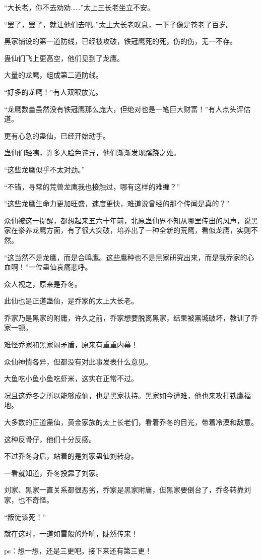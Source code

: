 \begin{this_body}
“大长老，你不去劝劝……”太上三长老坐立不安。

“罢了，罢了，就让他们去吧。”太上大长老叹息，一下子像是苍老了百岁。

黑家铺设的第一道防线，已经被攻破，铁冠鹰死的死，伤的伤，无一不存。

蛊仙们飞上更高空，他们见到了龙鹰。

大量的龙鹰，组成第二道防线。

“好多的龙鹰！”有人双眼放光。

“龙鹰数量虽然没有铁冠鹰那么庞大，但绝对也是一笔巨大财富！”有人点头评估道。

更有心急的蛊仙，已经开始动手。

蛊仙们轻咦，许多人脸色诧异，他们渐渐发现蹊跷之处。

“这些龙鹰似乎不太对劲。”

“不错，寻常的荒兽龙鹰我也接触过，哪有这样的难缠？”

“这些龙鹰生命力更加旺盛，速度更快，难道说曾经的那个传闻是真的？”

众仙被这一提醒，都想起来五六十年前，北原蛊仙界不知从哪里传出的风声，说黑家在豢养龙鹰方面，有了很大突破，培养出了一种全新的荒鹰，看似龙鹰，实则不然。

“这当然不是龙鹰，而是合鸣鹰。这些鹰种也不是黑家研究出来，而是我乔家的心血啊！”一位蛊仙哀痛悲呼。

众人视之，原来是乔冬。

此仙也是正道蛊仙，是乔家的太上大长老。

乔家乃是黑家的附庸，许久之前，乔家想要脱离黑家，结果被黑城破坏，教训了乔家一顿。

难怪乔家和黑家闹矛盾，原来有重重内幕！

众仙神情各异，但都没有对此事发表什么意见。

大鱼吃小鱼小鱼吃虾米，这实在正常不过。

况且这乔冬之所以能够成仙，也是黑家扶持。黑家如今遭难，他也来攻打铁鹰福地。

大多数的正道蛊仙，黄金家族的太上长老们，看着乔冬的目光，带着冷漠和敌意。

这种反骨仔，他们十分反感。

不过乔冬身后，站着的是刘家蛊仙刘转身。

一看就知道，乔冬投靠了刘家。

刘家、黑家一直关系都很恶劣，乔家是黑家附庸，但黑家要倒台了，乔冬转靠刘家，也不奇怪。

“叛徒该死！”

就在这时，一道如雷般的炸响，陡然传来！

ps：想一想，还是三更吧。接下来还有第三更！

\end{this_body}


